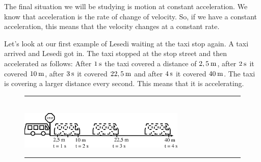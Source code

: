         
        \label{m38795*id71822}The final situation we will be studying is motion at constant acceleration. We know that acceleration is the rate of change of velocity. So, if we have a constant acceleration, this means that the velocity changes at a constant rate.\par 
        \label{m38795*id71827}Let's look at our first example of Lesedi waiting at the taxi stop again. A taxi arrived and Lesedi got in. The taxi stopped at the stop street and then accelerated as follows: After \begin{math}1\phantom{\rule{2pt}{0ex}}\mathrm{s}\end{math} the taxi covered a distance of \begin{math}2,5\phantom{\rule{2pt}{0ex}}\mathrm{m}\end{math}, after \begin{math}2\phantom{\rule{2pt}{0ex}}\mathrm{s}\end{math} it covered \begin{math}10\phantom{\rule{2pt}{0ex}}\mathrm{m}\end{math}, after \begin{math}3\phantom{\rule{2pt}{0ex}}\mathrm{s}\end{math} it covered \begin{math}22,5\phantom{\rule{2pt}{0ex}}\mathrm{m}\end{math} and after \begin{math}4\phantom{\rule{2pt}{0ex}}\mathrm{s}\end{math} it covered \begin{math}40\phantom{\rule{2pt}{0ex}}\mathrm{m}\end{math}. The taxi is covering a larger distance every second. This means that it is accelerating.\par 
        
    \setcounter{subfigure}{0}


	\begin{figure}[H] %
    \begin{center}
    \rule[.1in]{\figurerulewidth}{.005in} \\
        \label{m38795*uid113!!!underscore!!!media}\label{m38795*uid113!!!underscore!!!printimage}\includegraphics[width=300px]{col11305.imgs/m38795_PG10C2_025.png} %
        
      \vspace{2pt}
    \vspace{.1in}
    \rule[.1in]{\figurerulewidth}{.005in} \\
        
    \end{center}

 \end{figure}   


